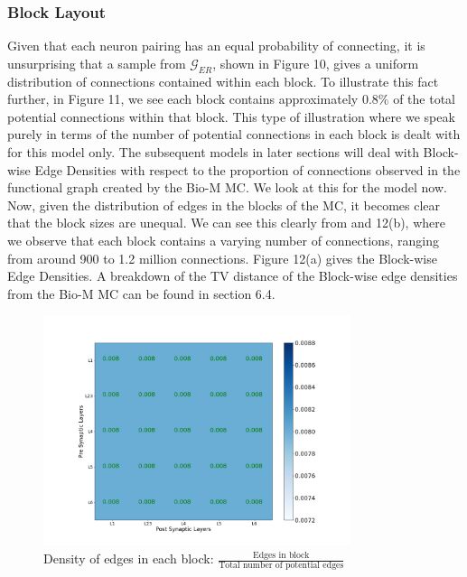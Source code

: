 \subsubsection{Block Layout}
Given that each neuron pairing has an equal probability of connecting, it is unsurprising that a sample from $\mathcal{G}_{ER}$, shown in Figure 10, gives a uniform distribution of connections contained within each block. To illustrate this fact further, in Figure 11, we see each block contains approximately $0.8\%$ of the total potential connections within that block. This type of illustration where we speak purely in terms of the number of potential connections in each block is dealt with for this model only. The subsequent models in later sections will deal with Block-wise Edge Densities with respect to the proportion of connections observed in the functional graph created by the Bio-M MC. We look at this for the \ER model now.  
Now, given the distribution of edges in the blocks of the MC, it becomes clear that the block sizes are unequal. We can see this clearly from and 12(b), where we observe that each block contains a varying number of connections, ranging from around 900 to 1.2 million connections. Figure 12(a) gives the Block-wise Edge Densities. A breakdown of the TV distance of the Block-wise edge densities from the Bio-M MC can be found in section 6.4.
\begin{figure}[H]
\begin{center}
\captionsetup{justification=centering}
\includegraphics[width=9cm]{ER/heat_map_layer_Erdos-Renyi probability.png}
\caption{Density of edges in each block: $\frac{\text{Edges in block}}{\text{Total number of potential edges}}$}
\end{center}
\end{figure}


